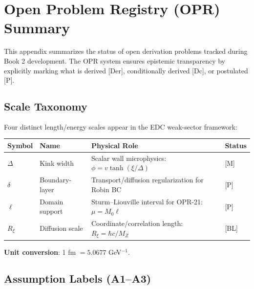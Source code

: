 
\section*{Open Problem Registry (OPR) Summary}
\label{sec:appendix-opr-summary}

This appendix summarizes the status of open derivation problems tracked during
Book 2 development. The OPR system ensures epistemic transparency by explicitly
marking what is derived [Der], conditionally derived [Dc], or postulated [P].

\subsection*{Scale Taxonomy}

Four distinct length/energy scales appear in the EDC weak-sector framework:

\begin{center}
\begin{tabular}{@{}llll@{}}
\toprule
Symbol & Name & Physical Role & Status \\
\midrule
$\Delta$ & Kink width & Scalar wall microphysics: $\phi = v \tanh(\xi/\Delta)$ & [M] \\
$\delta$ & Boundary-layer & Transport/diffusion regularization for Robin BC & [P] \\
$\ell$ & Domain support & Sturm--Liouville interval for OPR-21: $\mu = M_0\ell$ & [P] \\
$R_\xi$ & Diffusion scale & Coordinate/correlation length: $R_\xi = \hbar c/M_Z$ & [BL] \\
\bottomrule
\end{tabular}
\end{center}

\textbf{Unit conversion}: 1 fm $= 5.0677$ GeV$^{-1}$.

\subsection*{Assumption Labels (A1--A3)}

